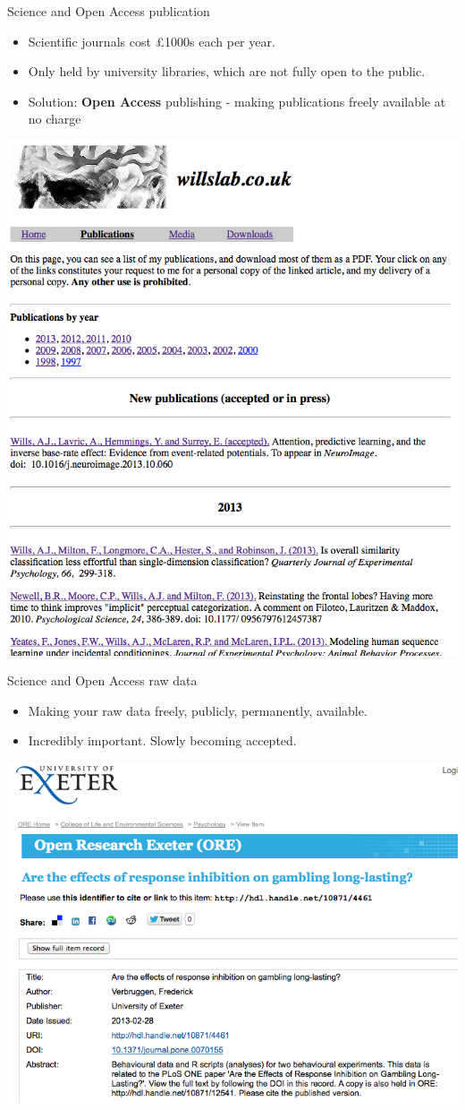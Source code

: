 \documentclass{beamer}
\begin{document}
\begin{frame}{Science and Open Access publication}
	\begin{itemize}
		\item Scientific journals cost \pounds 1000s each per year.
		\item Only held by university libraries, which are not fully open to the public.
		\item Solution: \textbf{Open Access} publishing - making publications freely available at no charge
	\end{itemize}
	\centerline{\includegraphics[width=.6\textwidth]{pics/willslab.png}}
\end{frame}

\begin{frame}{Science and Open Access raw data}
	\begin{itemize}
		\item Making your raw data freely, publicly, permanently, available.
		\item Incredibly important. Slowly becoming accepted.
	\end{itemize}
	\centerline{\includegraphics[width=.6\textwidth]{pics/verbruggen.png}}
\end{frame}
\end{document}
